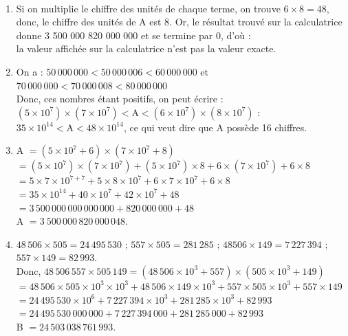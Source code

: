 \begin{corrige} 
\ \\ [-5mm]
   \begin{enumerate}
      \item Si on multiplie le chiffre des unités de chaque terme, on trouve $6\times8 =48$, donc, le chiffre des unités de A est 8. Or, le résultat trouvé sur la calculatrice donne 3 500 000 820 000 000 et se termine par 0, d'où : \\
         {\blue la valeur affichée sur la calculatrice n'est pas la valeur exacte}.
      \item On a : $50\,000\,000<50\,000\,006<60\,000\,000$ et $70\,000\,000<70\,000\,008<80\,000\,000$ \\
         Donc, ces nombres étant positifs, on peut écrire :$(5\times10^7)\times(7\times10^7)<\text{A}<(6\times10^7)\times(8\times10^7)$ : \\
         {\blue $35\times10^{14} < \text{A} < 48\times10^{14}$}, ce qui veut dire que {\blue A possède 16 chiffres}.
      \item A $=(5 \times 10^7+6)\times(7\times10^7+8)$ \\
         \hspace*{0.7cm} $=(5\times10^7)\times(7\times10^7)+(5\times10^7)\times8+6\times(7\times10^7)+6\times8$ \\
         \hspace*{0.7cm} $=5\times7\times10^{7+7}+5\times8\times10^7+6\times7\times10^7+6\times8$ \\
         \hspace*{0.7cm} $=35\times10^{14}+40\times10^7+42\times10^{7}+48$ \\
         \hspace*{0.7cm} $=3\,500\,000\,000\,000\,000+820\,000\,000+48$ \\
         {\blue A $=3\ 500\,000\,820\,000\,048$.} 
      \item $48\,506\times505 =24\,495\,530$ \qquad ; \qquad $557\times505 =281\,285$ \qquad ; \qquad $48 506\times149 =7\,227\,394$ \qquad ; \qquad $557\times149 =82\,993$. \\
       Donc, $48\,506\,557\times505\,149 =(48\,506\times10^3+557)\times(505\times10^3+149)$ \\
         \hspace*{3.85cm} $=48\,506\times505\times10^3\times10^3+48\,506\times149\times10^3+557\times505\times10^3+557\times149$ \\
         \hspace*{3.85cm} $=24\,495\,530\times10^6+7\,227\,394\times10^3+281\,285\times10^3+82\,993$ \\
         \hspace*{3.85cm} $=24\,495\,530\,000\,000+7\,227\,394\,000+281\,285\,000+82\,993$ \\
         { \blue B $=24\,503\,038\,761\,993$}.
   \end{enumerate}
\end{corrige}


